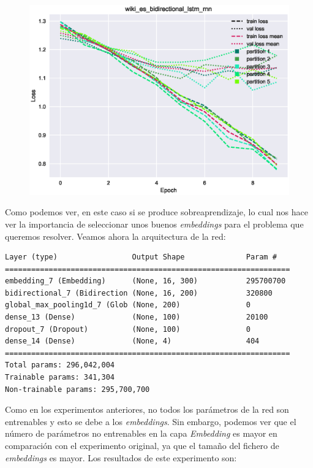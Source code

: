 \documentclass[11pt]{article}
\begin{document}
\begin{figure}[H]
\includegraphics[width=\linewidth]{images/loss/wiki_es_bidirectional_lstm_rnn-1554403834.eps}
\end{figure}

Como podemos ver, en este caso si se produce sobreaprendizaje, lo cual nos hace ver la importancia de seleccionar unos buenos \textit{embeddings} para el problema que queremos resolver. Veamos ahora la arquitectura de la red:

\begin{verbatim}
Layer (type)                 Output Shape              Param #   
=================================================================
embedding_7 (Embedding)      (None, 16, 300)           295700700 
bidirectional_7 (Bidirection (None, 16, 200)           320800    
global_max_pooling1d_7 (Glob (None, 200)               0         
dense_13 (Dense)             (None, 100)               20100     
dropout_7 (Dropout)          (None, 100)               0         
dense_14 (Dense)             (None, 4)                 404       
=================================================================
Total params: 296,042,004
Trainable params: 341,304
Non-trainable params: 295,700,700
\end{verbatim}

Como en los experimentos anteriores, no todos los parámetros de la red son entrenables y esto se debe a los \textit{embeddings}. Sin embargo, podemos ver que el número de parámetros no entrenables en la capa \textit{Embedding} es mayor en comparación con el experimento original, ya que el tamaño del fichero de \textit{embeddings} es mayor. Los resultados de este experimento son: 
\end{document}
